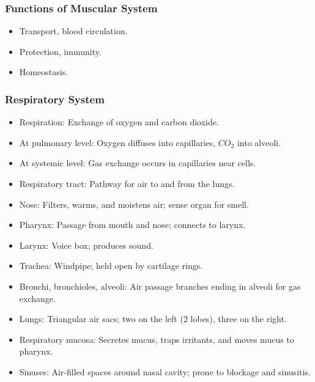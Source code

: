 \begin{frame}[fragile]\frametitle{Functions of Muscular System }

      \begin{itemize}
		\item Transport, blood circulation.
		\item Protection, immunity.
		\item Homeostasis.
	  \end{itemize}

\end{frame}

\begin{frame}[fragile]\frametitle{Respiratory System}

      \begin{itemize}
		\item Respiration: Exchange of oxygen and carbon dioxide.
		\item At pulmonary level: Oxygen diffuses into capillaries, $CO_2$ into alveoli.
		\item At systemic level: Gas exchange occurs in capillaries near cells.
		\item Respiratory tract: Pathway for air to and from the lungs.
		\item Nose: Filters, warms, and moistens air; sense organ for smell.
		\item Pharynx: Passage from mouth and nose; connects to larynx.
		\item Larynx: Voice box; produces sound.
		\item Trachea: Windpipe; held open by cartilage rings.
		\item Bronchi, bronchioles, alveoli: Air passage branches ending in alveoli for gas exchange.
		\item Lungs: Triangular air sacs; two on the left (2 lobes), three on the right.
		\item Respiratory mucosa: Secretes mucus, traps irritants, and moves mucus to pharynx.
		\item Sinuses: Air-filled spaces around nasal cavity; prone to blockage and sinusitis.
	  \end{itemize}

\end{frame}

